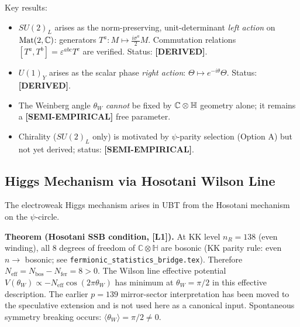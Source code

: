 Key results:
\begin{itemize}
  \item $SU(2)_L$ arises as the norm-preserving, unit-determinant \emph{left action}
    on $\mathrm{Mat}(2,\mathbb C)$: generators $T^a : M \mapsto \frac{i\sigma^a}{2} M$.
    Commutation relations $[T^a, T^b] = \varepsilon^{abc}T^c$ are verified.
    Status: \textbf{[DERIVED]}.
  \item $U(1)_Y$ arises as the scalar phase \emph{right action}: $\Theta \mapsto e^{-i\theta}\Theta$.
    Status: \textbf{[DERIVED]}.
  \item The Weinberg angle $\theta_W$ \emph{cannot} be fixed by $\mathbb C\otimes\mathbb H$ geometry alone;
    it remains a \textbf{[SEMI-EMPIRICAL]} free parameter.
  \item Chirality ($SU(2)_L$ only) is motivated by $\psi$-parity selection (Option A)
    but not yet derived; status: \textbf{[SEMI-EMPIRICAL]}.
\end{itemize}



\providecommand{\Lone}{\textbf{[L1]}}

\subsection{Higgs Mechanism via Hosotani Wilson Line}
\label{sec:hosotani_higgs}

The electroweak Higgs mechanism arises in UBT from the Hosotani mechanism
on the $\psi$-circle.

\medskip
\noindent\textbf{Theorem (Hosotani SSB condition, \Lone).}\quad
At KK level $n_R = 138$ (even winding), all 8 degrees of freedom
of $\mathbb{C}\otimes\mathbb{H}$ are bosonic (KK parity rule:
even $n \to$ bosonic; see \texttt{fermionic\_statistics\_bridge.tex}).
Therefore $N_{\mathrm{eff}} = N_{\mathrm{bos}} - N_{\mathrm{fer}} = 8 > 0$.
The Wilson line effective potential $V(\theta_W) \propto -N_{\mathrm{eff}}
\cos(2\pi\theta_W)$ has minimum at $\theta_W = \pi/2$ in this effective description.
The earlier $p=139$ mirror-sector interpretation has been moved to the
speculative extension and is not used here as a canonical input.
Spontaneous symmetry breaking occurs: $\langle\theta_W\rangle = \pi/2 \neq 0$.

